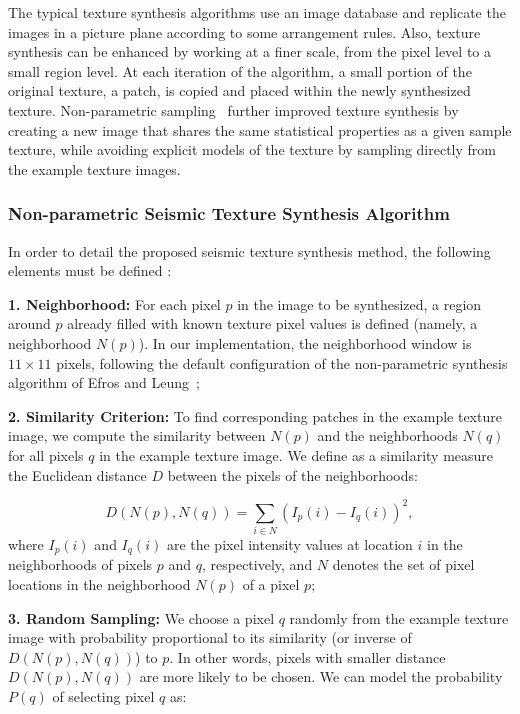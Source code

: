 \documentclass{ieeeaccess}
\begin{document}
The typical texture synthesis algorithms use an image database and replicate the images in a picture plane according to some arrangement rules. Also, texture synthesis can be enhanced by working at a finer scale, from the pixel level to a small region level. At each iteration of the algorithm, a small portion of the original texture, a patch, is copied and placed within the newly synthesized texture. Non-parametric sampling~\cite{Efros1999} further improved texture synthesis by creating a new image that shares the same statistical properties as a given sample texture, while avoiding explicit models of the texture by sampling directly from the example texture images.


\subsubsection{Non-parametric Seismic Texture Synthesis Algorithm}

In order to detail the proposed seismic texture synthesis method, the following elements must be defined :

\textbf{1. Neighborhood:} For each pixel $p$ in the image to be synthesized, a region around $p$ already filled with known texture pixel values is defined (namely, a neighborhood $N(p)$). In our implementation, the neighborhood window is $11 \times 11$ pixels, following the default configuration of the non-parametric synthesis algorithm of Efros and Leung~\cite{Efros1999};

\textbf{2. Similarity Criterion:} To find corresponding patches in the example texture image, we compute the similarity between $N(p)$ and the neighborhoods $N(q)$ for all pixels $q$ in the example texture image. We define as a similarity measure the Euclidean distance $D$ between the pixels of the neighborhoods:

\begin{equation}
D(N(p), N(q)) = \sum_{i \in N} \left( I_p(i) - I_q(i) \right)^2,
\end{equation}
where $I_p(i)$ and $I_q(i)$ are the pixel intensity values at location $i$ in the neighborhoods of pixels $p$ and $q$, respectively, and $N$ denotes the set of pixel locations in the neighborhood $N(p)$ of a pixel $p$;

\textbf{3. Random Sampling:} We choose a pixel $q$ randomly from the example texture image with probability proportional to its similarity (or inverse of $D(N(p), N(q))$) to $p$. In other words, pixels with smaller distance $D(N(p), N(q))$ are more likely to be chosen. We can model the probability $P(q)$ of selecting pixel $q$ as:
\end{document}
